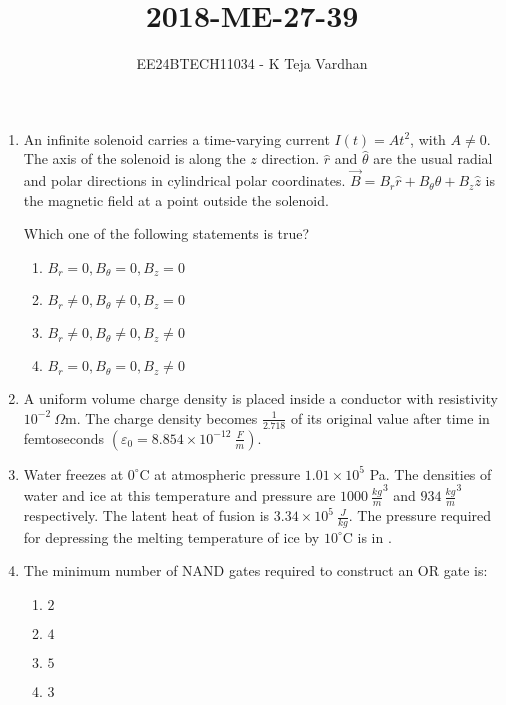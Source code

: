\documentclass{article}
\newcommand{\brak}[1]{\left( #1 \right)}
\begin{document}

\title{2018-ME-27-39}
\author{EE24BTECH11034 - K Teja Vardhan}
{\let\newpage\relax\maketitle}

\begin{enumerate}

\item An infinite solenoid carries a time-varying current $I\brak{t} = At^2$, with $A \neq 0$. The axis of the solenoid is along the $z$ direction. $\hat{r}$ and $\hat{\theta}$ are the usual radial and polar directions in cylindrical polar coordinates. $\vec{B} = B_r \hat{r} + B_{\theta} \hat{\theta} + B_z \hat{z}$ is the magnetic field at a point outside the solenoid.

Which one of the following statements is true?  

\begin{enumerate}
    \item  $B_r = 0, B_{\theta} = 0, B_z = 0$
    \item  $B_r \neq 0, B_{\theta} \neq 0, B_z = 0$
    \item  $B_r \neq 0, B_{\theta} \neq 0, B_z \neq 0$
    \item  $B_r = 0, B_{\theta} = 0, B_z \neq 0$
\end{enumerate}

\item A uniform volume charge density is placed inside a conductor with resistivity $10^{-2}~\Omega\text{m}$. The charge density becomes $\frac{1}{2.718}$ of its original value after time in femtoseconds  $\brak{\varepsilon_0 = 8.854 \times 10^{-12}~\frac{F}{m}}$.

\item Water freezes at $0^\circ$C at atmospheric pressure $1.01 \times 10^5$ Pa. The densities of water and ice at this temperature and pressure are $1000~\frac{kg}{m}^3$ and $934~\frac{kg}{m}^3$ respectively. The latent heat of fusion is $3.34 \times 10^5~\frac{J}{kg}$. The pressure required for depressing the melting temperature of ice by $10^\circ$C is in .

\item The minimum number of NAND gates required to construct an OR gate is:

\begin{enumerate}
    \item $2$
    \item $4$
    \item $5$
    \item $3$
\end{enumerate}


\end{enumerate}
\end{document}
